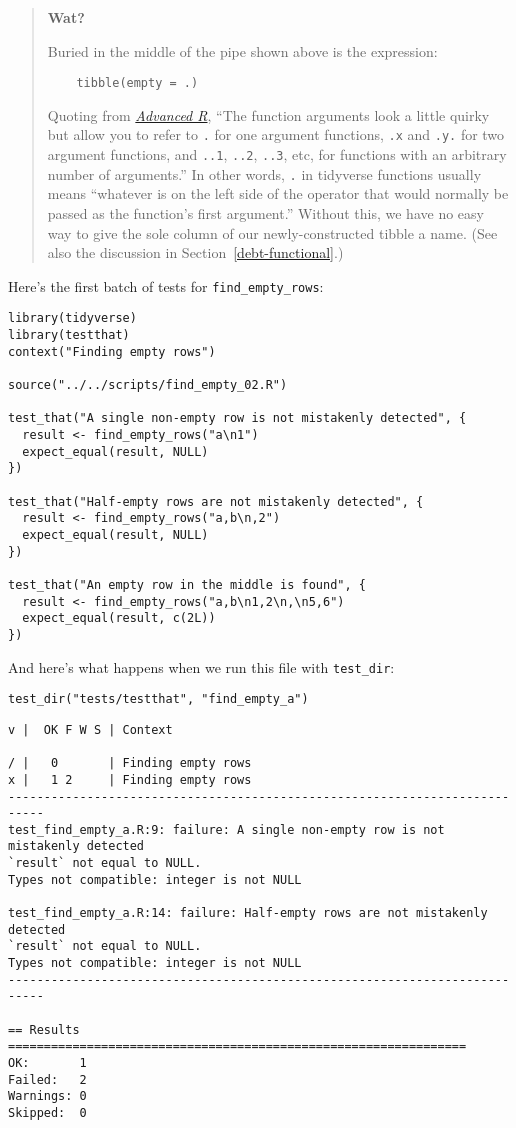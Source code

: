 \begin{quote}
\textbf{Wat?}

Buried in the middle of the pipe shown above is the expression:

\begin{lstlisting}
    tibble(empty = .)
\end{lstlisting}

\noindent
Quoting from \emph{\href{http://adv-r.had.co.nz/}{Advanced R}},
``The function arguments look a little quirky
but allow you to refer to \texttt{.} for one argument functions,
\texttt{.x} and \texttt{.y.} for two argument functions,
and \texttt{..1}, \texttt{..2}, \texttt{..3}, etc, for functions with an arbitrary number of arguments.''
In other words,
\texttt{.} in tidyverse functions usually means
``whatever is on the left side of the \texttt{\pipe} operator
that would normally be passed as the function's first argument.''
Without this,
we have no easy way to give the sole column of our newly-constructed tibble a name.
(See also the discussion in Section~\ref{debt-functional}.)
\end{quote}

Here's the first batch of tests for \texttt{find\_empty\_rows}:

\begin{lstlisting}
library(tidyverse)
library(testthat)
context("Finding empty rows")

source("../../scripts/find_empty_02.R")

test_that("A single non-empty row is not mistakenly detected", {
  result <- find_empty_rows("a\n1")
  expect_equal(result, NULL)
})

test_that("Half-empty rows are not mistakenly detected", {
  result <- find_empty_rows("a,b\n,2")
  expect_equal(result, NULL)
})

test_that("An empty row in the middle is found", {
  result <- find_empty_rows("a,b\n1,2\n,\n5,6")
  expect_equal(result, c(2L))
})
\end{lstlisting}

\noindent
And here's what happens when we run this file with \texttt{test\_dir}:

\begin{lstlisting}
test_dir("tests/testthat", "find_empty_a")
\end{lstlisting}

\begin{lstlisting}
v |  OK F W S | Context

/ |   0       | Finding empty rows
x |   1 2     | Finding empty rows
---------------------------------------------------------------------------
test_find_empty_a.R:9: failure: A single non-empty row is not mistakenly detected
`result` not equal to NULL.
Types not compatible: integer is not NULL

test_find_empty_a.R:14: failure: Half-empty rows are not mistakenly detected
`result` not equal to NULL.
Types not compatible: integer is not NULL
---------------------------------------------------------------------------

== Results ================================================================
OK:       1
Failed:   2
Warnings: 0
Skipped:  0
\end{lstlisting}

